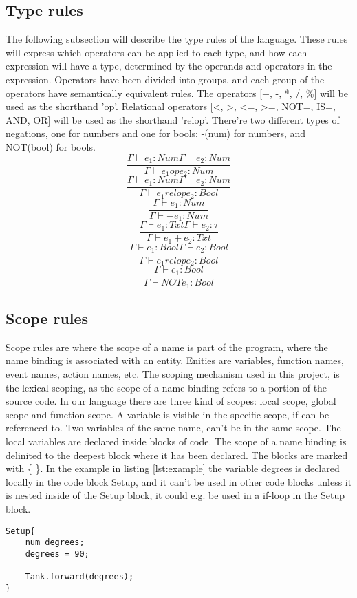 \subsection{Type rules}
The following subsection will describe the type rules of the language. These rules will express which operators can be applied to each type, and how each expression will have a type, determined by the operands and operators in the expression.
Operators have been divided into groups, and each group of the operators have semantically equivalent rules.
The operators [+, -, *, /, \%] will be used as the shorthand 'op'. Relational operators [<, >, <=, >=, NOT=, IS=, AND, OR] will be used as the shorthand 'relop'. There're two different types of negations, one for numbers and one for bools: -(num) for numbers, and NOT(bool) for bools.
\[
\dfrac{\Gamma \vdash e_1 : Num \Gamma \vdash e_2 : Num}{\Gamma \vdash e_1 op e_2 : Num}
\]
\[
\dfrac{\Gamma \vdash e_1 : Num \Gamma \vdash e_2 : Num}{\Gamma \vdash e_1 relop e_2 : Bool}
\]
\[
\dfrac{\Gamma \vdash e_1 : Num}{\Gamma \vdash -e_1 : Num}
\]
\[
\dfrac{\Gamma \vdash e_1 : Txt \Gamma \vdash e_2 : \tau}{\Gamma \vdash e_1 + e_2 : Txt}
\]
\[
\dfrac{\Gamma \vdash e_1 : Bool \Gamma \vdash e_2 : Bool}{\Gamma \vdash e_1 relop e_2 : Bool}
\]
\[
\dfrac{\Gamma \vdash e_1 : Bool}{\Gamma \vdash NOTe_1 : Bool}
\]
\subsection{Scope rules}
Scope rules are where the scope of a name is part of the program, where the name binding is associated with an entity. Enities are variables, function names, event names, action names, etc. The scoping mechanism used in this project, is the lexical scoping, as the scope of a name binding refers to a portion of the source code. In our language there are three kind of scopes: local scope, global scope and function scope. A variable is visible in the specific scope, if can be referenced to. Two variables of the same name, can't be in the same scope. The local variables are declared inside blocks of code. The scope of a name binding is delinited to the deepest block where it has been declared. The blocks are marked with \{ \}. In the example in listing \ref{lst:example} the variable degrees is declared locally in the code block Setup, and it can't be used in other code blocks unless it is nested inside of the Setup block, it could e.g. be used in a if-loop in the Setup block. 

\begin{lstlisting}[caption={Example of local scoping rules},  xleftmargin=.2\textwidth, label={lst:example}]
Setup{
	num degrees;
	degrees = 90;
	
	Tank.forward(degrees);
}
\end{lstlisting}

